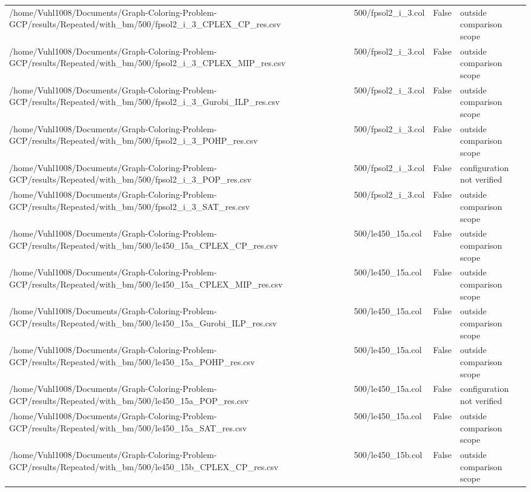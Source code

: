 \begin{table}[htbp]
\begin{tabular}{llll}
/home/Vuhl1008/Documents/Graph-Coloring-Problem-GCP/results/Repeated/with\_bm/500/fpsol2\_i\_3\_CPLEX\_CP\_res.csv & 500/fpsol2\_i\_3.col & False & outside comparison scope \\
/home/Vuhl1008/Documents/Graph-Coloring-Problem-GCP/results/Repeated/with\_bm/500/fpsol2\_i\_3\_CPLEX\_MIP\_res.csv & 500/fpsol2\_i\_3.col & False & outside comparison scope \\
/home/Vuhl1008/Documents/Graph-Coloring-Problem-GCP/results/Repeated/with\_bm/500/fpsol2\_i\_3\_Gurobi\_ILP\_res.csv & 500/fpsol2\_i\_3.col & False & outside comparison scope \\
/home/Vuhl1008/Documents/Graph-Coloring-Problem-GCP/results/Repeated/with\_bm/500/fpsol2\_i\_3\_POHP\_res.csv & 500/fpsol2\_i\_3.col & False & outside comparison scope \\
/home/Vuhl1008/Documents/Graph-Coloring-Problem-GCP/results/Repeated/with\_bm/500/fpsol2\_i\_3\_POP\_res.csv & 500/fpsol2\_i\_3.col & False & configuration not verified \\
/home/Vuhl1008/Documents/Graph-Coloring-Problem-GCP/results/Repeated/with\_bm/500/fpsol2\_i\_3\_SAT\_res.csv & 500/fpsol2\_i\_3.col & False & outside comparison scope \\
/home/Vuhl1008/Documents/Graph-Coloring-Problem-GCP/results/Repeated/with\_bm/500/le450\_15a\_CPLEX\_CP\_res.csv & 500/le450\_15a.col & False & outside comparison scope \\
/home/Vuhl1008/Documents/Graph-Coloring-Problem-GCP/results/Repeated/with\_bm/500/le450\_15a\_CPLEX\_MIP\_res.csv & 500/le450\_15a.col & False & outside comparison scope \\
/home/Vuhl1008/Documents/Graph-Coloring-Problem-GCP/results/Repeated/with\_bm/500/le450\_15a\_Gurobi\_ILP\_res.csv & 500/le450\_15a.col & False & outside comparison scope \\
/home/Vuhl1008/Documents/Graph-Coloring-Problem-GCP/results/Repeated/with\_bm/500/le450\_15a\_POHP\_res.csv & 500/le450\_15a.col & False & outside comparison scope \\
/home/Vuhl1008/Documents/Graph-Coloring-Problem-GCP/results/Repeated/with\_bm/500/le450\_15a\_POP\_res.csv & 500/le450\_15a.col & False & configuration not verified \\
/home/Vuhl1008/Documents/Graph-Coloring-Problem-GCP/results/Repeated/with\_bm/500/le450\_15a\_SAT\_res.csv & 500/le450\_15a.col & False & outside comparison scope \\
/home/Vuhl1008/Documents/Graph-Coloring-Problem-GCP/results/Repeated/with\_bm/500/le450\_15b\_CPLEX\_CP\_res.csv & 500/le450\_15b.col & False & outside comparison scope \\

\end{tabular}
\end{table}
